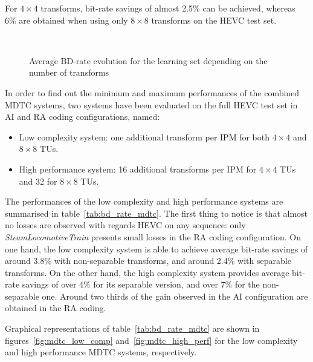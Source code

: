 \documentclass[11pt,a4paper,openright,twoside]{book}
\numberwithin{equation}{section} %
\numberwithin{figure}{section} %
\numberwithin{table}{section} %
\begin{document}
For $4\times4$ transforms, bit-rate savings of almost 2.5\% can be achieved,
whereas 6\% are obtained when using only $8\times8$ transforms on the
\ac{HEVC} test set.

\begin{figure}[tb]
	\centering
	\\
	\caption[\acs{BD}-rate for different separable and non-separable
	transform sets]
	{Average \acs{BD}-rate evolution for the learning set depending
	on the number of transforms}
	\label{fig:mdtc_bdrate_ntransforms}
\end{figure}

In order to find out the minimum and maximum performances of the combined
\ac{MDTC} systems, two systems have been evaluated on the full \ac{HEVC} test
set in \ac{AI} and \ac{RA} coding configurations, named:
\begin{itemize}
	\item Low complexity system: one additional transform per \ac{IPM}
		for both $4\times4$ and $8\times8$ \acp{TU}.
	\item High performance system: 16 additional transforms per \ac{IPM} for
		$4\times4$ \acp{TU} and 32 for $8\times8$ \acp{TU}.
\end{itemize}
The performances of the low complexity and high performance systems are
summarised in table~\ref{tab:bd_rate_mdtc}.
The first thing to notice is that almost no losses are observed with regards
\ac{HEVC} on any sequence: only \emph{SteamLocomotiveTrain} presents small
losses in the \ac{RA} coding configuration.
On one hand, the low complexity system is able to achieve average bit-rate
savings of around 3.8\% with non-separable transforms, and around 2.4\% with
separable transforms.
On the other hand, the high complexity system provides average bit-rate
savings of over 4\% for its separable version, and over 7\% for the
non-separable one.
Around two thirds of the gain observed in the \ac{AI} configuration are
obtained in the \ac{RA} coding.

Graphical representations of table~\ref{tab:bd_rate_mdtc} are shown in
figures~\ref{fig:mdtc_low_comp} and~\ref{fig:mdtc_high_perf} for the
low complexity and high performance \ac{MDTC} systems, respectively.
\end{document}
